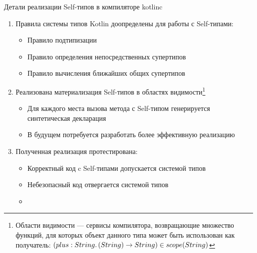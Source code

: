 \documentclass[usenames, dvipsnames]{beamer}
\begin{document}
    \begin{frame}{Детали реализации Self-типов в компиляторе kotlinc}
        \begin{enumerate}
            \item Правила системы типов Kotlin доопределены для работы с Self-типами:
            \begin{itemize}
                \item Правило подтипизации
                \item Правило определения непосредственных супертипов
                \item Правило вычисления ближайших общих супертипов
            \end{itemize}
            \item Реализована материализация Self-типов в областях видимости\footnote{Области видимости --- сервисы компилятора, возвращающие множество функций, для которых объект данного типа может быть использован как получатель: $(plus : String\ldotp(String) \to String) \in scope(String)$}
            \begin{itemize}
                \item Для каждого места вызова метода с Self-типом генерируется синтетическая декларация
                \item В будущем потребуется разработать более эффективную реализацию
            \end{itemize}
            \item Полученная реализация протестирована:
            \begin{itemize}
                \item Корректный код c Self-типами допускается системой типов
                \item Небезопасный код отвергается системой типов
                \item %
            \end{itemize}
        \end{enumerate}
    \end{frame}
\end{document}
